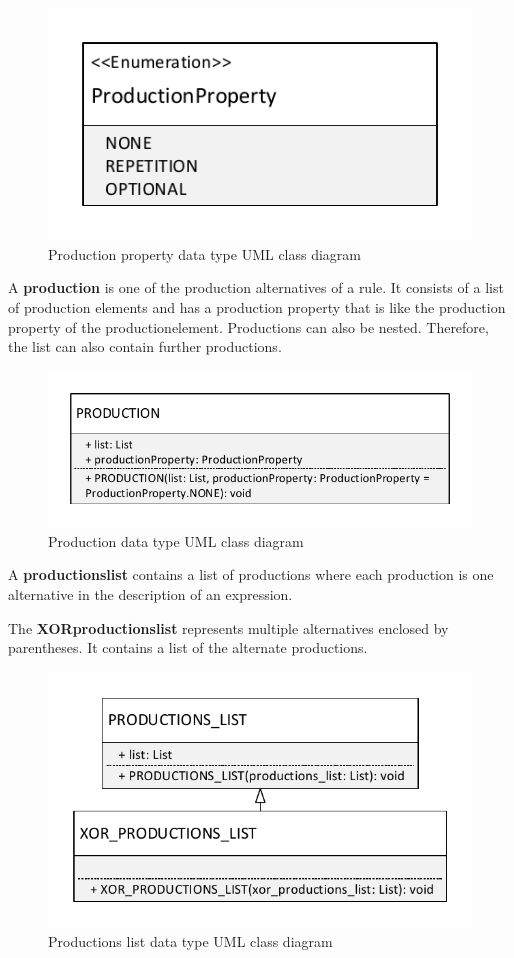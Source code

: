 \begin{figure}[H]
\centering
\includegraphics[width=.4\textwidth]{images/Concept_uml_data_types_production_property.pdf}
\caption{Production property data type UML class diagram}
\label{fig:ConceptProductionPropertyClassDiagram}
\end{figure}

A \textbf{production} is one of the production alternatives of a rule.
It consists of a list of production elements and has a production property that is like the production property of the production\textunderscore element. Productions can also be nested.
Therefore, the list can also contain further productions. 

\begin{figure}[H]
\centering
\includegraphics[width=.5\textwidth]{images/Concept_uml_data_types_production.pdf}
\caption{Production data type UML class diagram}
\label{fig:ConceptProductionClassDiagram}
\end{figure}

A \textbf{productions\textunderscore list} contains a list of productions where each production is one alternative in the description of an expression. 

The \textbf{XOR\textunderscore productions\textunderscore list} represents multiple alternatives enclosed by parentheses. It contains a list of the alternate productions. 

\begin{figure}[H]
\centering
\includegraphics[width=.6\textwidth]{images/Concept_uml_data_types_productions_list.pdf}
\caption{Productions list data type UML class diagram}
\label{fig:ConceptProductionsListClassDiagram}
\end{figure}


